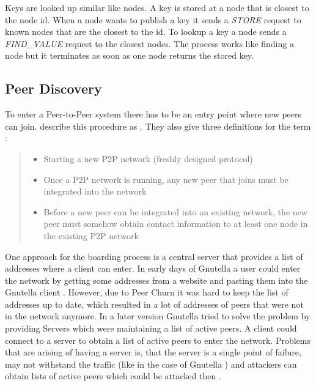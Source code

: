 Keys are  looked up similar like nodes. A key is stored at a node that is closest to the node id. When a node wants to publish a key it sends a \textit{STORE} request to known nodes that are the closest to the id.
To lookup a key a node sends a \textit{FIND\_VALUE} request to the closest nodes. The process works like finding a node but it terminates as soon as one node returns the stored key.

\subsection{Peer Discovery}
To enter a Peer-to-Peer system there has to be an entry point where new peers can join. 
\citet{p2p-bootstrapping} describe this procedure as . 
They also give three definitions for the term :
\begin{quote}
    \begin{itemize}
        \item Starting a new P2P network (freshly designed protocol)
        \item Once a P2P network is running, any new peer that joins must be integrated into the network
        \item Before a new peer can be integrated into an existing network, the new peer must somehow obtain contact information to at least one node in the existing P2P network
    \end{itemize}
\end{quote} \citet[p. 3]{p2p-bootstrapping}

One approach for the boarding process is a central server that provides a list of addresses where a client can enter. In early days of Gnutella a user could enter the network by getting some addresses from a website and pasting them into the Gnutella client \cite[\S3.2]{gnutellaAnalysis}. However, due to Peer Churn it was hard to keep the list of addresses up to date, which resulted in a lot of addresses of peers that were not in the network anymore. In a later version Gnutella tried to solve the problem by providing  Servers which were maintaining a list of active peers. A client could connect to a  server to obtain a list of active peers to enter the network. Problems that are arising of having a server is, that the server is a single point of failure, may not withstand the traffic (like in the case of Gnutella \cite[\S3.2]{gnutellaAnalysis}) and attackers can obtain lists of active peers which could be attacked then \cite[p. 7]{p2p-bootstrapping}.

